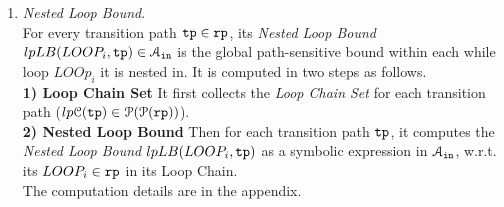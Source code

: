 \begin{enumerate}
%
\item \emph{Nested Loop Bound}.
\\
For every transition path $\mathtt{tp} \in \mathtt{rp}$, 
its \emph{Nested Loop Bound} $lpLB(LOOP_i, \mathtt{tp}) \in \mathcal{A}_{\mathtt{in}}$ is the global path-sensitive bound within each while loop $LOOp_i$ it is nested in.
It is computed in two steps as follows.
\\
\textbf{1) Loop Chain Set} It first collects the \emph{Loop Chain Set}
for each transition path ($lp\mathcal{C}(\mathtt{tp}) \in \mathcal{P}(\mathcal{P}(\mathtt{rp}))$).
\\
\textbf{2) Nested Loop Bound}  Then for each transition path $\mathtt{tp}$,
it computes
the \emph{Nested Loop Bound} $lpLB(LOOP_i, \mathtt{tp})$ as a symbolic expression in $\mathcal{A}_{\mathtt{in}}$, w.r.t.
its $LOOP_i \in \mathtt{rp}$  in its Loop Chain.
\\
The computation details are in the appendix.

\end{enumerate}
